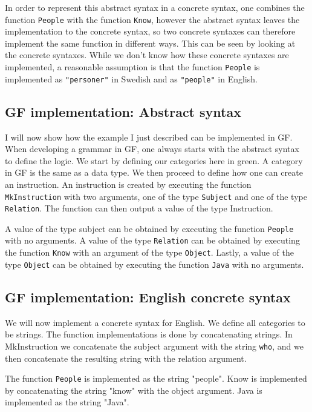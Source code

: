 \documentclass[
10pt, %
a4paper, %
oneside, %
headinclude,footinclude, %
BCOR5mm, %
]{scrartcl}
\begin{document}
In order to represent this abstract syntax in a concrete syntax, one combines the function \texttt{People} with the function \texttt{Know}, however the abstract syntax leaves the implementation to the concrete syntax, so two concrete syntaxes can therefore implement the same function in different ways. This can be seen by looking at the concrete syntaxes. While we don't know how these concrete syntaxes are implemented, a reasonable assumption is that the function \texttt{People} is implemented as \texttt{"personer"} in Swedish and as \texttt{"people"} in English.

\subsection{GF implementation: Abstract syntax}
I will now show how the example I just described can be implemented in GF. When developing a grammar in GF, one always starts with the abstract syntax to define the logic.
\newline
\newline
We start by defining our categories here in green. A category in GF is the same as a data type.
\newline
\newline
We then proceed to define how one can create an instruction. An instruction is created by executing the function \texttt{MkInstruction} with two arguments, one of the type \texttt{Subject} and one of the type \texttt{Relation}. The function can then output a value of the type Instruction.

A value of the type subject can be obtained by executing the function \texttt{People} with no arguments. A value of the type \texttt{Relation} can be obtained by executing the function \texttt{Know} with an argument of the type \texttt{Object}. Lastly, a value of the type \texttt{Object} can be obtained by executing the function \texttt{Java} with no arguments.

\subsection{GF implementation: English concrete syntax}
We will now implement a concrete syntax for English. We define all categories to be strings. The function implementations is done by concatenating strings. In MkInstruction we concatenate the subject argument with the string \texttt{who}, and we then concatenate the resulting string with the relation argument.

The function \texttt{People} is implemented as the string "people". Know is implemented by concatenating the string "know" with the object argument. Java is implemented as the string "Java".
\end{document}
